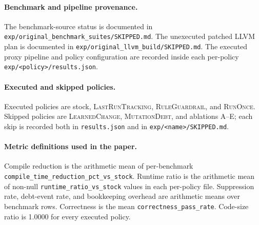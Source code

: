 \documentclass{article}
\begin{document}
\paragraph{Benchmark and pipeline provenance.}
The benchmark-source status is documented in \texttt{exp/original\_benchmark\_suites/SKIPPED.md}. The unexecuted patched LLVM plan is documented in \texttt{exp/original\_llvm\_build/SKIPPED.md}. The executed proxy pipeline and policy configuration are recorded inside each per-policy \texttt{exp/<policy>/results.json}.

\paragraph{Executed and skipped policies.}
Executed policies are stock, \textsc{LastRunTracking}, \textsc{RuleGuardrail}, and \textsc{RunOnce}. Skipped policies are \textsc{LearnedChange}, \textsc{MutationDebt}, and ablations A--E; each skip is recorded both in \texttt{results.json} and in \texttt{exp/<name>/SKIPPED.md}.

\paragraph{Metric definitions used in the paper.}
Compile reduction is the arithmetic mean of per-benchmark \texttt{compile\_time\_reduction\_pct\_vs\_stock}. Runtime ratio is the arithmetic mean of non-null \texttt{runtime\_ratio\_vs\_stock} values in each per-policy file. Suppression rate, debt-event rate, and bookkeeping overhead are arithmetic means over benchmark rows. Correctness is the mean \texttt{correctness\_pass\_rate}. Code-size ratio is 1.0000 for every executed policy.
\end{document}

